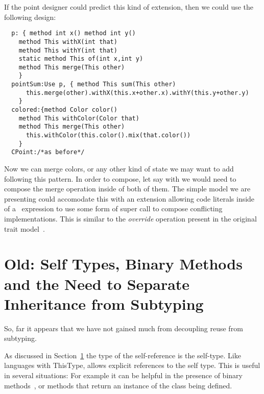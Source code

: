 If the point designer could predict this kind of extension, then we could use the following design:  
\begin{lstlisting}
  p: { method int x() method int y()
    method This withX(int that)
    method This withY(int that)
    static method This of(int x,int y)
    method This merge(This other)
    }
  pointSum:Use p, { method This sum(This other)
      this.merge(other).withX(this.x+other.x).withY(this.y+other.y)
    }
  colored:{method Color color()
    method This withColor(Color that)
    method This merge(This other)
      this.withColor(this.color().mix(that.color())
    }
  CPoint:/*as before*/
\end{lstlisting}  
  Now we can merge colors, or any other kind of state we may want to add
  following this pattern.
  In order to compose, let say \Q@colored@ with \Q@flavored@ we would
  need to compose the merge operation inside of both of them.
  The simple model we are presenting could accomodate this with an
  extension allowing code literals inside of a \use\ expression to use some form of super call to compose conflicting implementations. This is similar to the \emph{override} operation present in the original trait model~\cite{ducasse2006traits}.
  



\section{Old: Self Types, Binary Methods and the Need to Separate
  Inheritance from Subtyping}

So, far it appears that we have not gained much from decoupling
reuse from subtyping.

As discussed in Section~\ref{} the type of the self-reference is the
self-type. Like languages with ThisType, \name allows explicit
references to the self type. This is useful in several situations: 
For example it can be helpful in the presence of binary
methods~\cite{}, or methods that return an instance of the 
class being defined. 



